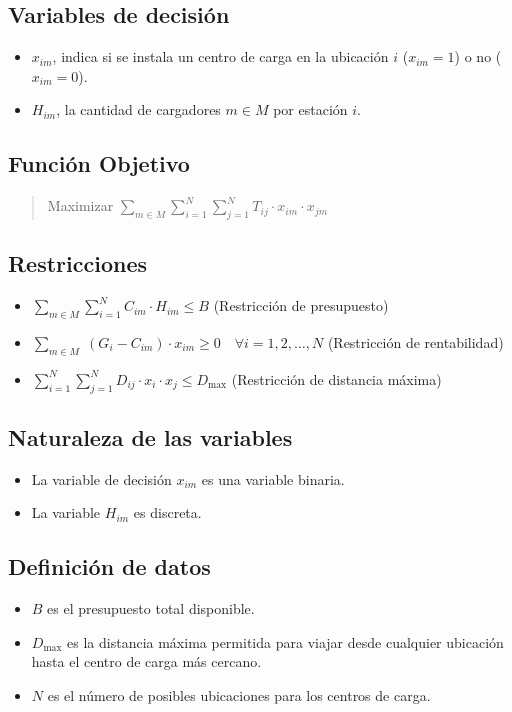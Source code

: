 \documentclass[letterpaper]{article}
\begin{document}
\begin{flushleft}
		\subsection{Variables de decisión} 
		\begin{itemize}
			\item $x_{im}$, indica si se instala un centro de carga en la ubicación $i$ ($x_{im} = 1$) o no ($x_{im} = 0$).
			\item $H_{im}$, la cantidad de cargadores $m \in M$ por estación $i$.

		\end{itemize}
		\subsection{Función Objetivo}
		\begin{quote}
			\begin{center}
				Maximizar $\sum_{m \in M}\sum_{i=1}^{N}\sum_{j=1}^{N} T_{ij} \cdot x_{im} \cdot x_{jm}$
			\end{center}
		\end{quote}
		\subsection{Restricciones}
		\begin{itemize}
			\item $\sum_{m \in M} \sum_{i=1}^{N} C_{im} \cdot H_{im} \leq B$ (Restricción de presupuesto)
			\item $\sum_{m \in M} \; (G_i - C_{im}) \cdot x_{im} \geq 0 \quad \forall i=1,2,\ldots,N$ (Restricción de rentabilidad)
			\item $\sum_{i=1}^{N} \sum_{j=1}^{N} D_{ij} \cdot x_i \cdot x_j \leq D_{\text{max}}$ (Restricción de distancia máxima)
		\end{itemize}
		\subsection{Naturaleza de las variables}
		\begin{itemize}
			\item La variable de decisión $x_{im}$ es una variable binaria.
			\item La variable $H_{im}$ es discreta. 
		\end{itemize}
		\subsection{Definición de datos}
		\begin{itemize}
			\item $B$ es el presupuesto total disponible.
			\item $D_{\text{max}}$ es la distancia máxima permitida para viajar desde cualquier ubicación hasta el centro de carga más cercano.
			\item $N$ es el número de posibles ubicaciones para los centros de carga.
		\end{itemize}

\end{flushleft}
\end{document}
